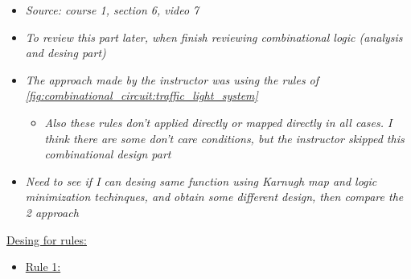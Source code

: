 \begin{itemize}

\item \textit{Source: course 1, section 6, video 7}

\item \textit{To review this part later, when finish reviewing combinational logic (analysis and desing part)}

\item \textit{The approach made by the instructor was using the rules of \autoref{fig:combinational_circuit:traffic_light_system}}

	\begin{itemize}
	\item \textit{Also these rules don't applied directly or mapped directly in all cases. I think there are some don't care conditions, but the instructor skipped this combinational design part}
	\end{itemize}

 
\item \textit{Need to see if I can desing same function using Karnugh map and logic minimization techinques, and obtain some different design, then compare the 2 approach}


\end{itemize}

\underline{Desing for rules:}

\begin{itemize}

\item \underline{Rule 1:} 


\end{itemize}

